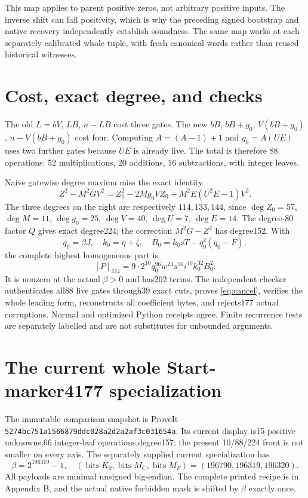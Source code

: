 This map applies to parent positive zeros, not arbitrary positive inputs.
The inverse shift can fail positivity, which is why the preceding signed
bootstrap and native recovery independently establish soundness. The same
map works at each separately calibrated whole tuple, with fresh canonical
words rather than reused historical witnesses.

\section{Cost, exact degree, and checks}
The old $L=bV$, $LB$, $n-LB$ cost three gates. The new
$bB$, $bB+g_0$, $V(bB+g_0)$, $n-V(bB+g_0)$ cost four.
Computing $A=(A-1)+1$ and $g_0=A(UE)$ uses two further gates because
$UE$ is already live. The total is therefore 88 operations:
52 multiplications, 20 additions, 16 subtractions, with integer leaves.

Naive gatewise degree maxima miss the exact identity
\begin{equation}
 Z^2-M^2GV^2=Z_0^2-2Mg_0VZ_0+M^2E(U^2E-1)V^2.\label{eq:cancel}
\end{equation}
The three degrees on the right are respectively $114,133,144$, since
$\deg Z_0=57$, $\deg M=11$, $\deg g_0=25$, $\deg V=40$,
$\deg U=7$, $\deg E=14$. The degree-80 factor $Q$ gives exact degree224;
the correction $M^2G-Z^2$ has degree152. With
\[
 q_0=\beta J,\quad k_0=\eta+\zeta,\quad
 B_0=k_0sT-q_0^2(q_0-F),
\]
the complete highest homogeneous part is
\[
 [P]_{224}=9\cdot2^{10}q_0^{96}w^{24}s^{56}i^{10}k_0^{32}B_0^2.
\]
It is nonzero at the actual $\beta>0$ and has202 terms. The independent
checker authenticates all88 live gates through39 exact cuts, proves
\eqref{eq:cancel}, verifies the whole leading form, reconstructs all
coefficient bytes, and rejects177 actual corruptions. Normal and optimized
Python receipts agree. Finite recurrence tests are separately labelled
and are not substitutes for unbounded arguments.

\section{The current whole Start-marker4177 specialization}
The immutable comparison snapshot is ProveIt
\texttt{5274bc751a1566879ddc028a2d2a2af3c031654a}. Its current display
is15 positive unknowns,66 integer-leaf operations,degree157; the present
10/88/224 front is not smaller on every axis. The separately supplied
current specialization has
\[
 \beta=2^{196319}-1,\quad
 (\operatorname{bits}K_0,\operatorname{bits}M_C,
 \operatorname{bits}M_F)=(196790,196319,196320).
\]
All payloads are minimal unsigned big-endian. The complete printed
recipe is in Appendix B, and the actual native forbidden mask is shifted
by $\beta$ exactly once.

